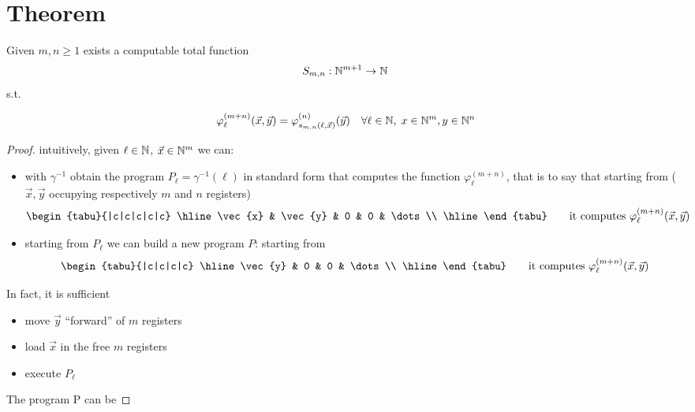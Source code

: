 \section{\smn Theorem}
\begin{theorem}
  Given $m, n \geq 1$ exists a computable total function
  \[S_{m,n} : \mathbb{N}^{m+1} \rightarrow \mathbb{N}\] s.t.

  \[
    \varphi_\ell^{(m+n)}(\vec{x},\vec{y}) = \varphi_{s_{m,n}(\ell,
      \vec{x})}^{(n)}(\vec{y}) \quad \forall \ell \in \mathbb{N}, \; x \in
    \mathbb{N}^m, y \in \mathbb{N}^n
  \]

  \begin{proof}
    intuitively, given $\ell \in \mathbb{N}$, $\vec{x}\in \mathbb{N}^m$ we can:
    \begin{itemize}
    \item with $\gamma^{-1}$ obtain the program
      $P_\ell = \gamma^{-1}(\ell)$ in standard form that computes the
      function $\varphi_\ell^{(m+n)}$, that is to say that starting
      from ( $\vec{x}, \vec{y}$ occupying respectively $m$ and $n$
      registers)
      \[
        \begin{tabu}{|c|c|c|c|c}
          \hline
          \vec{x} & \vec{y} & 0 & 0 & \dots \\ \hline
        \end{tabu}
        \quad \quad \mbox{it computes }
        \varphi_\ell^{(m+n)}(\vec{x},\vec{y})
      \]
    \item starting from $P_\ell$ we can build a new program $P$:
      starting from
      \[
        \begin{tabu}{|c|c|c|c}
          \hline
          \vec{y} & 0 & 0 & \dots \\ \hline
        \end{tabu}
        \quad \quad \mbox{it computes }
        \varphi_\ell^{(m+n)}(\vec{x},\vec{y})
      \]
    \end{itemize}

    In fact, it is sufficient
    \begin{itemize}
    \item move $\vec{y}$ ``forward'' of $m$ registers
    \item load $\vec{x}$ in the free $m$ registers
    \item execute $P_\ell$
    \end{itemize}

    The program P can be


\end{proof}
\end{theorem}
